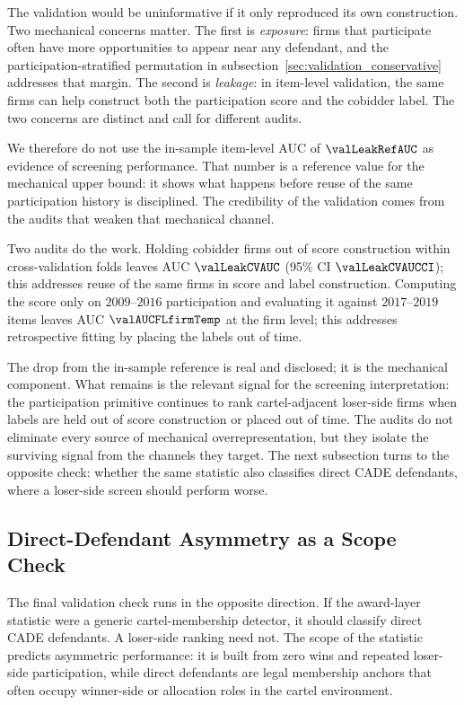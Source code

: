 The validation would be uninformative if it only reproduced
its own construction. Two mechanical concerns matter. The first
is \emph{exposure}: firms that participate often have more
opportunities to appear near any defendant, and the
participation-stratified permutation in
subsection~\ref{sec:validation_conservative} addresses that
margin. The second is \emph{leakage}: in item-level validation,
the same firms can help construct both the participation score
and the cobidder label. The two concerns are distinct and call
for different audits.

We therefore do not use the in-sample item-level AUC of
$\valLeakRefAUC$ as evidence of screening performance. That
number is a reference value for the mechanical upper bound: it
shows what happens before reuse of the same participation
history is disciplined. The credibility of the validation comes
from the audits that weaken that mechanical channel.

Two audits do the work. Holding cobidder firms out of score
construction within cross-validation folds leaves AUC
$\valLeakCVAUC$ (95\% CI $\valLeakCVAUCCI$); this addresses
reuse of the same firms in score and label construction.
Computing the score only on $2009$--$2016$ participation and
evaluating it against $2017$--$2019$ items leaves AUC
$\valAUCFLfirmTemp$ at the firm level; this addresses
retrospective fitting by placing the labels out of time.

The drop from the in-sample reference is real and disclosed; it
is the mechanical component. What remains is the relevant
signal for the screening interpretation: the participation
primitive continues to rank cartel-adjacent loser-side firms
when labels are held out of score construction or placed out of
time. The audits do not eliminate every source of mechanical
overrepresentation, but they isolate the surviving signal from
the channels they target. The next subsection turns to the
opposite check: whether the same statistic also classifies
direct CADE defendants, where a loser-side screen should
perform worse.

\subsection{Direct-Defendant Asymmetry as a Scope Check}
\label{sec:validation_direct}

The final validation check runs in the opposite direction. If
the award-layer statistic were a generic cartel-membership
detector, it should classify direct CADE defendants. A
loser-side ranking need not. The scope of the statistic predicts
asymmetric performance: it is built from zero wins and repeated
loser-side participation, while direct defendants are legal
membership anchors that often occupy winner-side or allocation
roles in the cartel environment.

